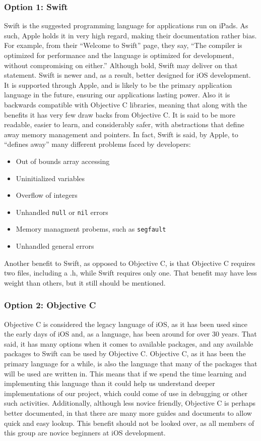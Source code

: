 \documentclass[onecolumn, draftclsnofoot,10pt, compsoc]{IEEEtran}
\begin{document}
\subsubsection{Option 1: Swift}
Swift is the suggested programming language for applications run on iPads.
As such, Apple holds it in very high regard, making their documentation rather bias.
For example, from their ``Welcome to Swift'' page, they say, ``The compiler is optimized for performance and the language is optimized for development, without compromising on either\cite{swift1}.''
Although bold, Swift may deliver on that statement.
Swift is newer and, as a result, better designed for iOS development.
It is supported through Apple, and is likely to be the primary application language in the future, ensuring our applications lasting power.
Also it is backwards compatible with Objective C libraries, meaning that along with the benefits it has very few draw backs from Objective C.
It is said to be more readable, easier to learn, and considerably safer, with abstractions that define away memory management and pointers.
In fact, Swift is said, by Apple, to ``defines away'' many different problems faced by developers:
\begin{itemize}
	\item  Out of bounds array accessing
	\item  Uninitialized variables
	\item  Overflow of integers
	\item  Unhandled \lstinline|null| or \lstinline|nil| errors
	\item  Memory managment probems, such as \lstinline|segfault|
	\item  Unhandled general errors
\end{itemize}
Another benefit to Swift, as opposed to Objective C, is that Objective C requires two files, including a .h, while Swift requires only one.
That benefit may have less weight than others, but it still should be mentioned.

\subsubsection{Option 2: Objective C}
Objective C is considered the legacy language of iOS, as it has been used since the early days of iOS and, as a language, has been around for over 30 years.
That said, it has many options when it comes to available packages, and any available packages to Swift can be used by Objective C.
Objective C, as it has been the primary language for a while, is also the language that many of the packages that will be used are written in.
This means that if we spend the time learning and implementing this language than it could help us understand deeper implementations of our project, which could come of use in debugging or other such activities.
Additionally, although less novice friendly, Objective C is perhaps better documented, in that there are many more guides and documents to allow quick and easy lookup.
This benefit should not be looked over, as all members of this group are novice beginners at iOS development.
\end{document}
